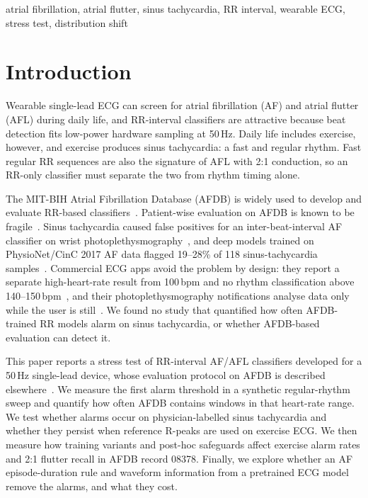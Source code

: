 \documentclass[conference,a4paper]{IEEEtran}
\begin{document}
\begin{IEEEkeywords}
atrial fibrillation, atrial flutter, sinus tachycardia, RR interval, wearable ECG, stress test, distribution shift
\end{IEEEkeywords}

\section{Introduction}
Wearable single-lead ECG can screen for atrial fibrillation (AF) and atrial flutter (AFL) during daily life, and RR-interval
classifiers are attractive because beat detection fits low-power hardware sampling at 50\,Hz. Daily life includes exercise,
however, and exercise produces sinus tachycardia: a fast and regular rhythm. Fast regular RR sequences are also the signature of
AFL with 2:1 conduction, so an RR-only classifier must separate the two from rhythm timing alone.

The MIT-BIH Atrial Fibrillation Database (AFDB) is widely used to develop and evaluate RR-based
classifiers~\cite{moody1983afdb,goldberger2000physionet,pollard2026physionet}. Patient-wise evaluation on AFDB is known to be
fragile~\cite{butkuviene2021,domazetoski2022}. Sinus tachycardia caused false positives for an inter-beat-interval AF classifier
on wrist photoplethysmography~\cite{genzoni2020}, and deep models trained on PhysioNet/CinC 2017 AF data flagged 19--28\% of
118 sinus-tachycardia samples~\cite{sanjana2020}. Commercial ECG apps avoid the problem by design: they report a separate
high-heart-rate result from 100\,bpm and no rhythm classification above 140--150\,bpm~\cite{apple_ecg,fda_k240909,kardia}, and
their photoplethysmography notifications analyse data only while the user is still~\cite{fda_den180042,fda_k212372}. We found
no study that quantified how often AFDB-trained RR models alarm on sinus tachycardia, or whether AFDB-based evaluation can
detect it.

This paper reports a stress test of RR-interval AF/AFL classifiers developed for a 50\,Hz single-lead device, whose evaluation
protocol on AFDB is described elsewhere~\cite{anon_paper1}. We measure the first alarm threshold in a synthetic
regular-rhythm sweep and quantify how often AFDB contains windows in that heart-rate range. We test whether alarms occur on
physician-labelled sinus tachycardia and whether they persist when reference R-peaks are used on exercise ECG. We then
measure how training variants and post-hoc safeguards affect exercise alarm rates and 2:1 flutter recall in AFDB record 08378.
Finally, we explore whether an AF episode-duration rule and waveform information from a pretrained ECG model remove the
alarms, and what they cost.
\end{document}

